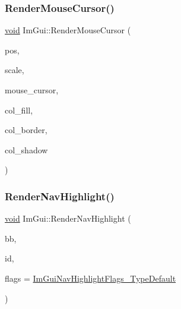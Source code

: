 \subsubsection{\texorpdfstring{Render\+Mouse\+Cursor()}{RenderMouseCursor()}}
{\footnotesize\ttfamily \hyperlink{imgui__impl__opengl3__loader_8h_ac668e7cffd9e2e9cfee428b9b2f34fa7}{void} Im\+Gui\+::\+Render\+Mouse\+Cursor (\begin{DoxyParamCaption}\item[{\hyperlink{structImVec2}{Im\+Vec2}}]{pos,  }\item[{float}]{scale,  }\item[{Im\+Gui\+Mouse\+Cursor}]{mouse\+\_\+cursor,  }\item[{Im\+U32}]{col\+\_\+fill,  }\item[{Im\+U32}]{col\+\_\+border,  }\item[{Im\+U32}]{col\+\_\+shadow }\end{DoxyParamCaption})}

\mbox{\label{namespaceImGui_afc84af0481214603f058b6ee31d20855}} 
\subsubsection{\texorpdfstring{Render\+Nav\+Highlight()}{RenderNavHighlight()}}
{\footnotesize\ttfamily \hyperlink{imgui__impl__opengl3__loader_8h_ac668e7cffd9e2e9cfee428b9b2f34fa7}{void} Im\+Gui\+::\+Render\+Nav\+Highlight (\begin{DoxyParamCaption}\item[{const \hyperlink{structImRect}{Im\+Rect} \&}]{bb,  }\item[{Im\+Gui\+ID}]{id,  }\item[{\hyperlink{imgui__internal_8h_a8c2855ba575756109c607c10697bcccd}{Im\+Gui\+Nav\+Highlight\+Flags}}]{flags = {\ttfamily \hyperlink{imgui__internal_8h_a55ae92b6fb7a0edbe4814f6e261d9e26ae54860a6f56817772ef7f1f42ca3c1bd}{Im\+Gui\+Nav\+Highlight\+Flags\+\_\+\+Type\+Default}} }\end{DoxyParamCaption})}

\mbox{\label{namespaceImGui_af311762331bda4508b25e05f6afc7f45}} 
